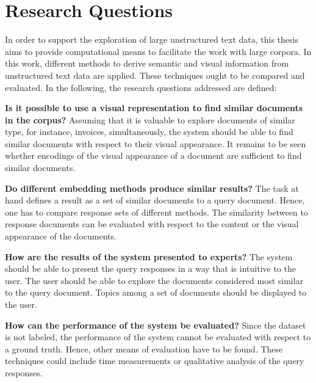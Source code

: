 \section{Research Questions}\label{sec:research-questions}

In order to support the exploration of large unstructured text data, 
this thesis aims to provide computational means to facilitate the work with large corpora.
In this work, different methods to derive semantic and visual information from unstructured text data are applied.
These techniques ought to be compared and evaluated.
In the following, the research questions addressed are defined:
\begin{questions}%
    \item \textbf{Is it possible to use a visual representation to find similar documents in the corpus?}\label{enum:rq1}
    Assuming that it is valuable to explore documents of similar type, for instance, invoices, simultaneously,
    the system should be able to find similar documents with respect to their visual appearance.
    It remains to be seen whether encodings of the visual appearance of a document are sufficient to find similar documents.

    \item \textbf{Do different embedding methods produce similar results?}\label{enum:rq4}
    The task at hand defines a result as a set of similar documents to a query document.
    Hence, one has to compare response sets of different methods.
    The similarity between to response documents can be evaluated with respect to the content or the visual appearance of the documents. 
    
    \item \textbf{How are the results of the system presented to experts?}\label{enum:rq2}
    The system should be able to present the query responses in a way that is intuitive to the user.
    The user should be able to explore the documents considered most similar to the query document.
    Topics among a set of documents should be displayed to the user.
    
    \item \textbf{How can the performance of the system be evaluated?}\label{enum:rq3}
    Since the dataset is not labeled, the performance of the system cannot be evaluated with respect to a ground truth.
    Hence, other means of evaluation have to be found.
    These techniques could include time measurements or qualitative analysis of the query responses.

\end{questions}